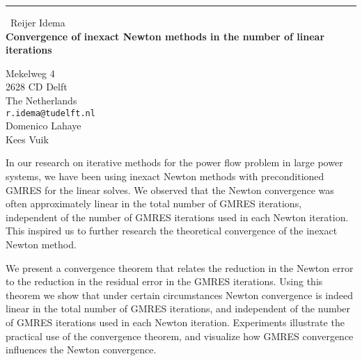 \documentclass{report}
\begin{document}
\begin{center}
\rule{6in}{1pt} \
{\large Reijer Idema \\
{\bf Convergence of inexact Newton methods in the number of linear iterations}}

Mekelweg 4 \\ 2628 CD Delft \\ The Netherlands
\\
{\tt r.idema@tudelft.nl}\\
Domenico Lahaye\\
Kees Vuik\end{center}

In our research on iterative methods for the power flow problem in large
power systems, we have been using inexact Newton methods with
preconditioned GMRES for the linear solves. We observed that the Newton
convergence was often approximately linear in the total number of GMRES
iterations, independent of the number of GMRES iterations used in each
Newton iteration. This inspired us to further research the theoretical
convergence of the inexact Newton method.

We present a convergence theorem that relates the reduction in the Newton
error to the reduction in the residual error in the GMRES iterations.
Using this theorem we show that under certain circumstances Newton
convergence is indeed linear in the total number of GMRES iterations, and
independent of the number of GMRES iterations used in each Newton
iteration. Experiments illustrate the practical use of the convergence
theorem, and visualize how GMRES convergence influences the Newton
convergence.
\end{document}
